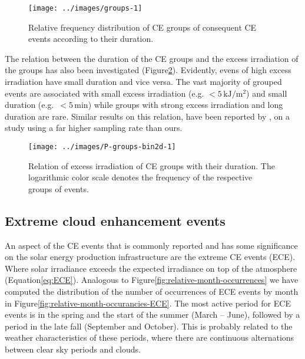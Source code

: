 \documentclass[preprint, 5p,
authoryear]{elsarticle} %
\begin{document}
\begin{figure}

{\centering \texttt{[image: ../images/groups-1]} 

}

\caption{Relative frequency distribution of CE groups of consequent CE events according to their duration.}\label{fig:ceg-duration-distribution}
\end{figure}

The relation between the duration of the CE groups and the excess
irradiation of the groups has also been investigated
(Figure\nobreakspace{}\ref{fig:group-2d}). Evidently, evens of high
excess irradiation have small duration and vice versa. The vast majority
of grouped events are associated with small excess irradiation (e.g.
\(<5\,\text{kJ}/\text{m}^2\)) and small duration
(e.g.~\(<5\,\text{min}\)) while groups with strong excess irradiation
and long duration are rare. Similar results on this relation, have been
reported by \citet{Zhang2018}, on a study using a far higher sampling
rate than ours.

\begin{figure}

{\centering \texttt{[image: ../images/P-groups-bin2d-1]} 

}

\caption{Relation of excess irradiation of CE groups with their duration. The logarithmic color scale denotes the frequency of the respective groups of events.}\label{fig:group-2d}
\end{figure}

\hypertarget{extreme-cloud-enhancement-events}{%
\subsection{Extreme cloud enhancement
events}\label{extreme-cloud-enhancement-events}}

An aspect of the CE events that is commonly reported and has some
significance on the solar energy production infrastructure are the
extreme CE events (ECE). Where solar irradiance exceeds the expected
irradiance on top of the atmosphere
(Equation\nobreakspace{}\ref{eq:ECE}). Analogous to
Figure\nobreakspace{}\ref{fig:relative-month-occurrences} we have
computed the distribution of the number of occurrences of ECE events by
month in Figure\nobreakspace{}\ref{fig:relative-month-occurancies-ECE}.
The most active period for ECE events is in the spring and the start of
the summer (March -- June), followed by a period in the late fall
(September and October). This is probably related to the weather
characteristics of these periods, where there are continuous
alternations between clear sky periods and clouds.
\end{document}
